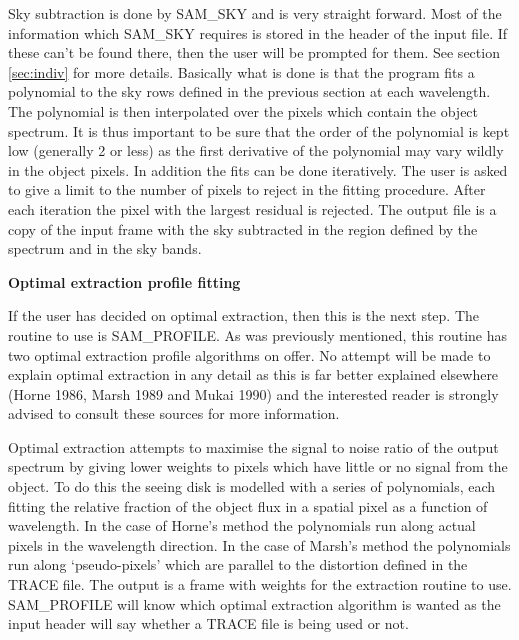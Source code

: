 Sky subtraction is done by SAM\_SKY and is very straight forward.  Most of 
the information which SAM\_SKY requires is stored in the header of the  input
file.  If these can't be found there, then the user will be prompted  for
them. See section \ref{sec:indiv} for more details.  Basically what is  done
is that the program fits a polynomial to the sky rows defined in the  previous
section at each wavelength.  The polynomial is then interpolated  over the
pixels which contain the object spectrum.  It is thus important to be  sure
that the order of the polynomial is kept low (generally 2 or less) as the
first derivative of the polynomial may vary wildly in the object  pixels.  In
addition the fits can be done iteratively. The user is  asked to give a limit
to the number of pixels to reject in the fitting  procedure.  After each
iteration the pixel with the largest residual is  rejected.  The output file
is a copy of the input frame with the sky  subtracted in the region defined by
the spectrum and in the sky bands.

{\bf Optimal extraction profile fitting}

If the user has decided on optimal extraction, then this is the next step. The
routine to use is SAM\_PROFILE.  As was previously mentioned, this  routine
has two optimal extraction profile algorithms on offer.  No attempt will be
made to explain optimal extraction in any detail as this is far  better
explained elsewhere (Horne 1986, Marsh 1989 and Mukai 1990) and  the
interested  reader is strongly advised to consult these sources for more
information.

Optimal extraction attempts to maximise the signal to noise ratio of the 
output spectrum by giving lower weights to pixels which have little or no 
signal from the object.  To do this the seeing disk is modelled with a series
of polynomials, each fitting the relative fraction of the object flux in  a
spatial pixel as a function of wavelength. In the case of Horne's method the
polynomials  run along actual pixels in the wavelength direction. In the case
of Marsh's method the polynomials run along `pseudo-pixels' which are parallel
to the distortion defined in the TRACE file.   The output is a frame with
weights for the extraction routine to use.  SAM\_PROFILE will know which
optimal extraction algorithm is wanted as the input header will say whether a
TRACE file is being used or not.

